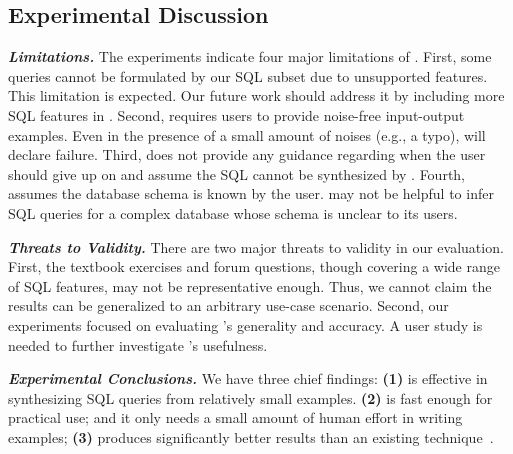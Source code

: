 \vspace{-1mm}
\subsection{Experimental Discussion}
\vspace{-1mm}

\enlargethispage{5pt}

\noindent \textbf{\textit{Limitations.}}
The experiments indicate four major limitations
of \ourtool. First, some queries
cannot be formulated by our SQL subset
due to unsupported features. This limitation is expected.
Our future work should address it by including more SQL
features in \ourtool. Second, \ourtool requires
users to provide noise-free input-output examples.
Even in the presence of a small amount of 
noises (e.g., a typo), \ourtool will declare failure.
Third, \ourtool does not provide any guidance regarding
when the user should give up on \ourtool and assume
the SQL cannot be synthesized by \ourtool.
Fourth, \ourtool assumes the database schema is
known by the user. \ourtool may not be helpful to infer
SQL queries for a complex database whose schema is
unclear to its users.

\vspace{.5mm}
\noindent \textbf{\textit{Threats to Validity.}}
There are two major threats to validity
in our evaluation. First, the \exnum textbook exercises
and \pnum forum questions, though covering
a wide range of SQL features, may not be representative enough.
Thus, we cannot claim the results can be generalized to an
arbitrary use-case scenario. Second, our
experiments focused on evaluating \ourtool's generality 
and accuracy. A user study is needed to further investigate
\ourtool's usefulness.


\vspace{.5mm}
\noindent \textbf{\textit{Experimental Conclusions.}}
We have three chief findings: \textbf{(1)}
\ourtool is effective in synthesizing SQL queries
from relatively small examples.
\textbf{(2)} \ourtool is fast enough for practical use;
and it only needs a small amount of human
effort in writing examples;
\textbf{(3)} \ourtool produces significantly better results
than an existing technique~\cite{Tran:2009}.




